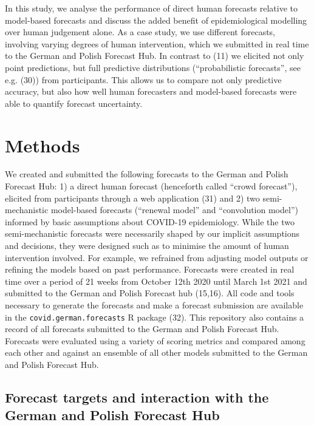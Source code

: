 \documentclass[
]{article}
\begin{document}
In this study, we analyse the performance of direct human forecasts relative to model-based forecasts and discuss the added benefit of epidemiological modelling over human judgement alone. As a case study, we use different forecasts, involving varying degrees of human intervention, which we submitted in real time to the German and Polish Forecast Hub. In contrast to (11) we elicited not only point predictions, but full predictive distributions (``probabilistic forecasts'', see e.g. (30)) from participants. This allows us to compare not only predictive accuracy, but also how well human forecasters and model-based forecasts were able to quantify forecast uncertainty.

\hypertarget{methods}{%
\section{Methods}\label{methods}}

We created and submitted the following forecasts to the German and Polish Forecast Hub: 1) a direct human forecast (henceforth called ``crowd forecast''), elicited from participants through a web application (31) and 2) two semi-mechanistic model-based forecasts (``renewal model'' and ``convolution model'') informed by basic assumptions about COVID-19 epidemiology. While the two semi-mechanistic forecasts were necessarily shaped by our implicit assumptions and decisions, they were designed such as to minimise the amount of human intervention involved. For example, we refrained from adjusting model outputs or refining the models based on past performance. Forecasts were created in real time over a period of 21 weeks from October 12th 2020 until March 1st 2021 and submitted to the German and Polish Forecast hub (15,16). All code and tools necessary to generate the forecasts and make a forecast submission are available in the \texttt{covid.german.forecasts} R package (32). This repository also contains a record of all forecasts submitted to the German and Polish Forecast Hub. Forecasts were evaluated using a variety of scoring metrics and compared among each other and against an ensemble of all other models submitted to the German and Polish Forecast Hub.

\hypertarget{forecast-targets-and-interaction-with-the-german-and-polish-forecast-hub}{%
\subsection{Forecast targets and interaction with the German and Polish Forecast Hub}\label{forecast-targets-and-interaction-with-the-german-and-polish-forecast-hub}}
\end{document}
